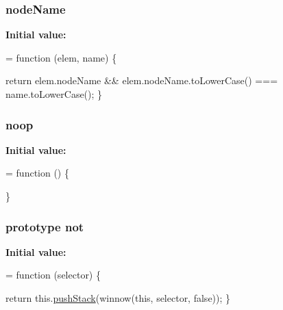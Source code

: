 \subsubsection[{\texorpdfstring{node\+Name}{nodeName}}]{ node\+Name}\hypertarget{jquery-2_82_81-vsdoc_8js_a269e960a03eef49b8ed3a84932c1334d}{}\label{jquery-2_82_81-vsdoc_8js_a269e960a03eef49b8ed3a84932c1334d}
{\bfseries Initial value\+:}
\begin{DoxyCode}
= \textcolor{keyword}{function} (elem, name) \{

        \textcolor{keywordflow}{return} elem.nodeName && elem.nodeName.toLowerCase() === name.toLowerCase();
    \}
\end{DoxyCode}
\subsubsection[{\texorpdfstring{noop}{noop}}]{ noop}\hypertarget{jquery-2_82_81-vsdoc_8js_a7acad2bce0af143b1f94283a7a811103}{}\label{jquery-2_82_81-vsdoc_8js_a7acad2bce0af143b1f94283a7a811103}
{\bfseries Initial value\+:}
\begin{DoxyCode}
= \textcolor{keyword}{function} () \{
        
    \}
\end{DoxyCode}
\subsubsection[{\texorpdfstring{not}{not}}]{ {\bf prototype} not}\hypertarget{jquery-2_82_81-vsdoc_8js_a78ab1ea877c73295e1e4cd1002ad38c7}{}\label{jquery-2_82_81-vsdoc_8js_a78ab1ea877c73295e1e4cd1002ad38c7}
{\bfseries Initial value\+:}
\begin{DoxyCode}
= \textcolor{keyword}{function} (selector) \{
        

        \textcolor{keywordflow}{return} this.\hyperlink{jquery-2_82_81-vsdoc_8js_afc3a7db1ef2b526338c06c07cecccd44}{pushStack}(winnow(\textcolor{keyword}{this}, selector, \textcolor{keyword}{false}));
    \}
\end{DoxyCode}

